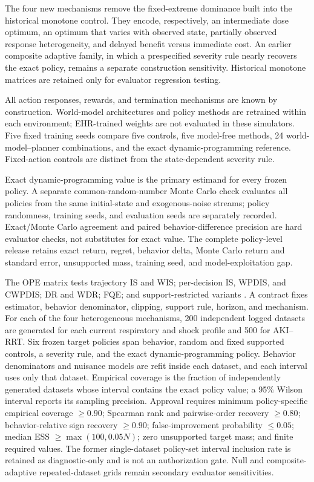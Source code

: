 \documentclass[sigconf,review]{acmart}
\begin{document}
The four new mechanisms remove the fixed-extreme dominance built into the historical monotone control. They encode, respectively, an intermediate dose optimum, an optimum that varies with observed state, partially observed response heterogeneity, and delayed benefit versus immediate cost. An earlier composite adaptive family, in which a prespecified severity rule nearly recovers the exact policy, remains a separate construction sensitivity. Historical monotone matrices are retained only for evaluator regression testing.

All action responses, rewards, and termination mechanisms are known by construction. World-model architectures and policy methods are retrained within each environment; EHR-trained weights are not evaluated in these simulators. Five fixed training seeds compare five controls, five model-free methods, 24 world-model--planner combinations, and the exact dynamic-programming reference. Fixed-action controls are distinct from the state-dependent severity rule.

Exact dynamic-programming value is the primary estimand for every frozen policy. A separate common-random-number Monte Carlo check evaluates all policies from the same initial-state and exogenous-noise streams; policy randomness, training seeds, and evaluation seeds are separately recorded. Exact/Monte Carlo agreement and paired behavior-difference precision are hard evaluator checks, not substitutes for exact value. The complete policy-level release retains exact return, regret, behavior delta, Monte Carlo return and standard error, unsupported mass, training seed, and model-exploitation gap.

The OPE matrix tests trajectory IS and WIS; per-decision IS, WPDIS, and CWPDIS; DR and WDR; FQE; and support-restricted variants \cite{thomas2016data,jiang2016doubly,hao2021bootstrapping}. A contract fixes estimator, behavior denominator, clipping, support rule, horizon, and mechanism. For each of the four heterogeneous mechanisms, 200 independent logged datasets are generated for each current respiratory and shock profile and 500 for AKI--RRT. Six frozen target policies span behavior, random and fixed supported controls, a severity rule, and the exact dynamic-programming policy. Behavior denominators and nuisance models are refit inside each dataset, and each interval uses only that dataset. Empirical coverage is the fraction of independently generated datasets whose interval contains the exact policy value; a 95\% Wilson interval reports its sampling precision. Approval requires minimum policy-specific empirical coverage $\geq0.90$; Spearman rank and pairwise-order recovery $\geq0.80$; behavior-relative sign recovery $\geq0.90$; false-improvement probability $\leq0.05$; median ESS $\geq\max(100,0.05N)$; zero unsupported target mass; and finite required values. The former single-dataset policy-set interval inclusion rate is retained as diagnostic-only and is not an authorization gate. Null and composite-adaptive repeated-dataset grids remain secondary evaluator sensitivities.
\end{document}
